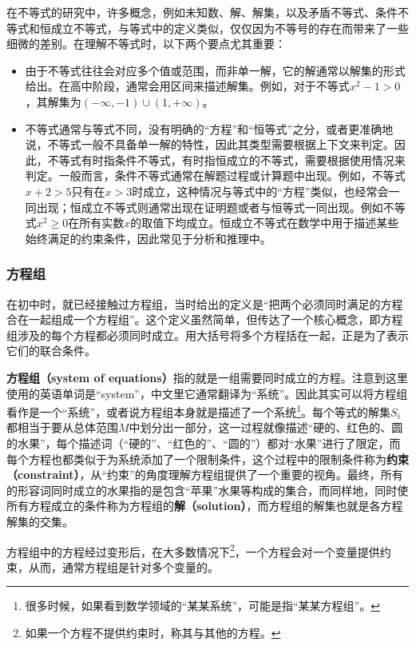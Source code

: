 在不等式的研究中，许多概念，例如未知数、解、解集，以及矛盾不等式、条件不等式和恒成立不等式，与等式中的定义类似，仅仅因为不等号的存在而带来了一些细微的差别。在理解不等式时，以下两个要点尤其重要：
\begin{itemize}
\item 由于不等式往往会对应多个值或范围，而非单一解，它的解通常以解集的形式给出。在高中阶段，通常会用区间来描述解集。例如，对于不等式$x^2 - 1 > 0$，其解集为$(-\infty, -1) \cup (1, +\infty)$。
\item 不等式通常与等式不同，没有明确的“方程”和“恒等式”之分，或者更准确地说，不等式一般不具备单一解的特性，因此其类型需要根据上下文来判定。因此，不等式有时指条件不等式，有时指恒成立的不等式，需要根据使用情况来判定。一般而言，条件不等式通常在解题过程或计算题中出现。例如，不等式$x + 2 > 5$只有在$x > 3$时成立，这种情况与等式中的“方程”类似，也经常会一同出现；恒成立不等式则通常出现在证明题或者与恒等式一同出现。例如不等式$x^2 \geq 0$在所有实数$x$的取值下均成立。恒成立不等式在数学中用于描述某些始终满足的约束条件，因此常见于分析和推理中。
\end{itemize}

\subsubsection{方程组}

在初中时，就已经接触过方程组，当时给出的定义是“把两个必须同时满足的方程合在一起组成一个方程组”。这个定义虽然简单，但传达了一个核心概念，即方程组涉及的每个方程都必须同时成立。用大括号将多个方程括在一起，正是为了表示它们的联合条件。

\textbf{方程组（system of equations）}指的就是一组需要同时成立的方程。注意到这里使用的英语单词是“system”，中文里它通常翻译为“系统”。因此其实可以将方程组看作是一个“系统”，或者说方程组本身就是描述了一个系统\footnote{很多时候，如果看到数学领域的“某某系统”，可能是指“某某方程组”。}。每个等式的解集$S_i$都相当于要从总体范围$M$中划分出一部分，这一过程就像描述“硬的、红色的、圆的水果”，每个描述词（“硬的”、“红色的”、“圆的”）都对“水果”进行了限定，而每个方程也都类似于为系统添加了一个限制条件，这个过程中的限制条件称为\textbf{约束（constraint）}，从“约束”的角度理解方程组提供了一个重要的视角。最终，所有的形容词同时成立的水果指的是包含“苹果”水果等构成的集合，而同样地，同时使所有方程成立的条件称为方程组的\textbf{解（solution）}，而方程组的解集也就是各方程解集的交集。

方程组中的方程经过变形后，在大多数情况下\footnote{如果一个方程不提供约束时，称其与其他的方程。}，一个方程会对一个变量提供约束，从而，通常方程组是针对多个变量的。

